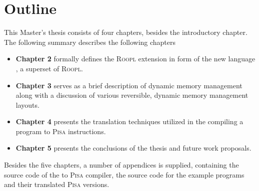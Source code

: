 \section{Outline}
\label{sec:outline}
This Master's thesis consists of four chapters, besides the introductory chapter. The following summary describes the following chapters
\begin{itemize}
    \item \textbf{Chapter 2} formally defines the \textsc{Roopl} extension in form of the new language \rooplpp, a superset of \textsc{Roopl}.
    \item \textbf{Chapter 3} serves as a brief description of dynamic memory management along with a discussion of various reversible, dynamic memory management layouts.
    \item \textbf{Chapter 4} presents the translation techniques utilized in the compiling a \rooplpp program to \textsc{Pisa} instructions.
    \item \textbf{Chapter 5} presents the conclusions of the thesis and future work proposals.
\end{itemize}

Besides the five chapters, a number of appendices is supplied, containing the source code of the \rooplpp to \textsc{Pisa} compiler, the \rooplpp source code for the example programs and their translated \textsc{Pisa} versions.